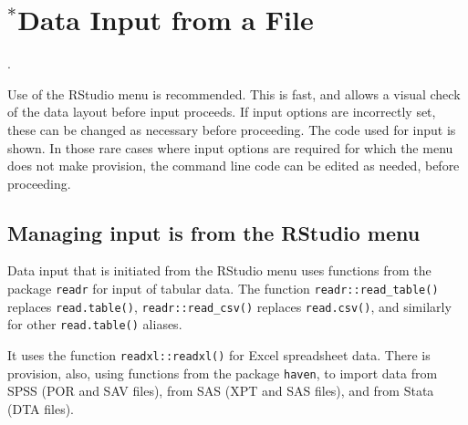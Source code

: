 






\section{$^*$Data Input from a File}\label{sec:entry}

.

Use of the RStudio menu is recommended.  This is fast, and allows
a visual check of the data layout before input proceeds.  If input
options are incorrectly set, these can be changed as necessary
before proceeding. The code used for input is shown. In those rare
cases where input options are required for which the menu does not 
make provision, the command line code can be edited as needed,
before proceeding.


\subsection{Managing input is from the RStudio menu}

Data input that is initiated from the RStudio menu uses functions
from the package \texttt{readr} for input of tabular data.
The function \texttt{readr::read\_table()} replaces
\texttt{read.table()}, \texttt{readr::read\_csv()} replaces
\texttt{read.csv()}, and similarly for other \texttt{read.table()}
aliases.

It uses the function \texttt{readxl::readxl()} for Excel
spreadsheet data. There is provision, also, using functions from
the package \texttt{haven}, to import data from SPSS (POR and
SAV files), from SAS (XPT and SAS files), and from Stata (DTA
files).  

